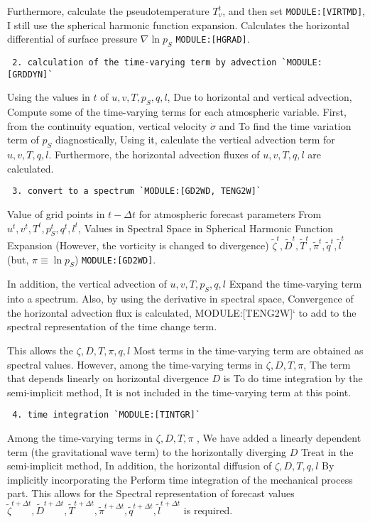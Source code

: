 Furthermore, calculate the pseudotemperature \(T_v^{t}\), and then set
\texttt{MODULE:{[}VIRTMD{]}}, I still use the spherical harmonic
function expansion. Calculates the horizontal differential of surface
pressure \(\nabla \ln p_S\) \texttt{MODULE:{[}HGRAD{]}}.

\begin{verbatim}
 2. calculation of the time-varying term by advection `MODULE:[GRDDYN]`
\end{verbatim}

Using the values in \(t\) of \(u, v, T, p_S, q, l\), Due to horizontal
and vertical advection, Compute some of the time-varying terms for each
atmospheric variable. First, from the continuity equation, vertical
velocity \(\dot{\sigma}\) and To find the time variation term of \(p_S\)
diagnostically, Using it, calculate the vertical advection term for
\(u, v, T, q, l\). Furthermore, the horizontal advection fluxes of
\(u, v, T, q, l\) are calculated.

\begin{verbatim}
 3. convert to a spectrum `MODULE:[GD2WD, TENG2W]`
\end{verbatim}

Value of grid points in \(t-\Delta t\) for atmospheric forecast
parameters From \(u^{t}, v^{t}, T^{t}, p_S^{t}, q^{t}, l^{t}\), Values
in Spectral Space in Spherical Harmonic Function Expansion (However, the
vorticity is changed to divergence)
\(\tilde{\zeta}^{t}, \tilde{D}^{t}, \tilde{T}^{t}, \tilde{\pi}^{t}, \tilde{q}^{t}, \tilde{l}^{t}\)
(but, \(\pi \equiv \ln p_S\)) \texttt{MODULE:{[}GD2WD{]}}.

In addition, the vertical advection of \(u, v, T, p_S, q, l\) Expand the
time-varying term into a spectrum. Also, by using the derivative in
spectral space, Convergence of the horizontal advection flux is
calculated, MODULE:{[}TENG2W{]}` to add to the spectral representation
of the time change term.

This allows the \(\zeta, D, T, \pi, q, l\) Most terms in the
time-varying term are obtained as spectral values. However, among the
time-varying terms in \(\zeta, D, T, \pi\), The term that depends
linearly on horizontal divergence \(D\) is To do time integration by the
semi-implicit method, It is not included in the time-varying term at
this point.

\begin{verbatim}
 4. time integration `MODULE:[TINTGR]`
\end{verbatim}

Among the time-varying terms in \(\zeta, D, T, \pi\) , We have added a
linearly dependent term (the gravitational wave term) to the
horizontally diverging \(D\) Treat in the semi-implicit method, In
addition, the horizontal diffusion of \(\zeta, D, T, q, l\) By
implicitly incorporating the Perform time integration of the mechanical
process part. This allows for the Spectral representation of forecast
values
\(\tilde{\zeta}^{t+\Delta t}, \tilde{D}^{t+\Delta t}, \tilde{T}^{t+\Delta t}, \tilde{\pi}^{t+\Delta t}, \tilde{q}^{t+\Delta t}, \tilde{l}^{t+\Delta t}\)
is required.

